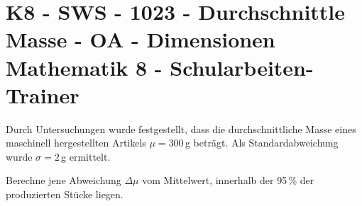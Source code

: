 \section{K8 - SWS - 1023 - Durchschnittle Masse - OA - Dimensionen Mathematik 8 - Schularbeiten-Trainer}

\begin{beispiel}[K8 - SWS]{1}
Durch Untersuchungen wurde festgestellt, dass die durchschnittliche Masse eines maschinell hergestellten Artikels $\mu=300$\,g beträgt. Als Standardabweichung wurde $\sigma=2$\,g ermittelt.

Berechne jene Abweichung $\Delta\mu$ vom Mittelwert, innerhalb der 95\,\% der produzierten Stücke liegen.

\end{beispiel}